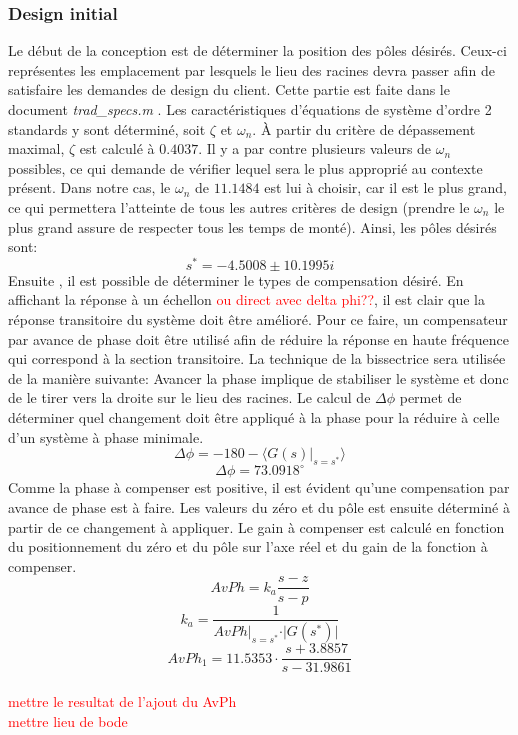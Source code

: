 \documentclass{udes_rapport} %
\begin{document}
\subsubsection{Design initial}
Le début de la conception est de déterminer la position des pôles désirés. Ceux-ci représentes les emplacement par lesquels le lieu des racines devra passer afin de satisfaire les demandes de design du client. Cette partie est faite dans le document \textit{trad\_specs.m} . Les caractéristiques d'équations de système d'ordre 2 standards y sont déterminé, soit $\zeta$ et $\omega _{n}$. À partir du critère de dépassement maximal, $\zeta$ est calculé à $0.4037$. Il y a par contre plusieurs valeurs de $\omega _{n}$ possibles, ce qui demande de vérifier lequel sera le plus approprié au contexte présent. Dans notre cas, le $\omega _{n}$ de $11.1484$ est lui à choisir, car il est le plus grand, ce qui permettera l'atteinte de tous les autres critères de design (prendre le $\omega _{n}$ le plus grand assure de respecter tous les temps de monté). Ainsi, les pôles désirés sont:
\[s^* = -4.5008\pm 10.1995i\]
Ensuite , il est possible de déterminer le types de compensation désiré. En affichant la réponse à un échellon \textcolor{red}{ou direct avec delta phi??}, il est clair que la réponse transitoire du système doit être amélioré. Pour ce faire, un compensateur par avance de phase doit être utilisé afin de réduire la réponse en haute fréquence qui correspond à la section transitoire. La technique de la bissectrice sera utilisée de la manière suivante:
Avancer la phase implique de stabiliser le système et donc de le tirer vers la droite sur le lieu des racines. Le calcul de $\Delta \phi$ permet de déterminer quel changement doit être appliqué à la phase pour la réduire à celle d'un système à phase minimale.
\[\Delta \phi = -180 - \langle G(s)\vert_{s = s^*} \rangle\]
\[\Delta \phi = 73.0918^\circ \]
Comme la phase à compenser est positive, il est évident qu'une compensation par avance de phase est à faire. Les valeurs du zéro et du pôle est ensuite déterminé à partir de ce changement à appliquer. Le gain à compenser est calculé en fonction du positionnement du zéro et du pôle sur l'axe réel et du gain de la fonction à compenser.
\[AvPh = k_a\frac{s-z}{s-p}\]
\[k_a = \frac{1}{AvPh \vert_{s = s^*} \cdot \vert G(s^*)  \vert } \]
\[AvPh_1 = 11.5353 \cdot \frac{s+3.8857}{s-31.9861}\]
\\
\textcolor{red}{mettre le resultat  de l'ajout du AvPh}
\\
\textcolor{red}{mettre lieu de bode}
\\
\end{document}
